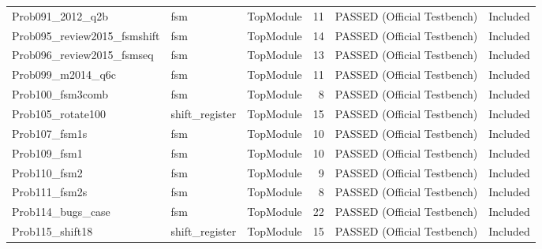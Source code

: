 \begin{table}
\begin{tabular}{lllrll}
Prob091_2012_q2b & fsm & TopModule & 11 & PASSED (Official Testbench) & Included \\
Prob095_review2015_fsmshift & fsm & TopModule & 14 & PASSED (Official Testbench) & Included \\
Prob096_review2015_fsmseq & fsm & TopModule & 13 & PASSED (Official Testbench) & Included \\
Prob099_m2014_q6c & fsm & TopModule & 11 & PASSED (Official Testbench) & Included \\
Prob100_fsm3comb & fsm & TopModule & 8 & PASSED (Official Testbench) & Included \\
Prob105_rotate100 & shift_register & TopModule & 15 & PASSED (Official Testbench) & Included \\
Prob107_fsm1s & fsm & TopModule & 10 & PASSED (Official Testbench) & Included \\
Prob109_fsm1 & fsm & TopModule & 10 & PASSED (Official Testbench) & Included \\
Prob110_fsm2 & fsm & TopModule & 9 & PASSED (Official Testbench) & Included \\
Prob111_fsm2s & fsm & TopModule & 8 & PASSED (Official Testbench) & Included \\
Prob114_bugs_case & fsm & TopModule & 22 & PASSED (Official Testbench) & Included \\
Prob115_shift18 & shift_register & TopModule & 15 & PASSED (Official Testbench) & Included \\
\bottomrule
\end{tabular}
\end{table}
